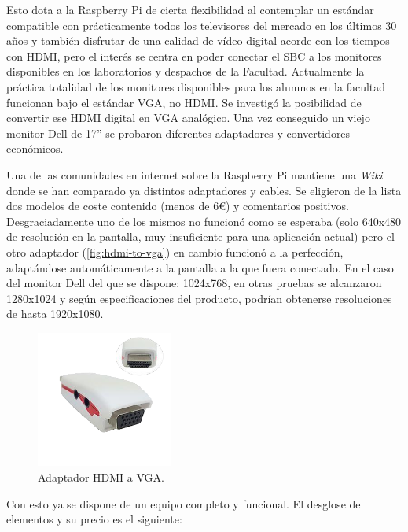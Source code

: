 Esto dota a la Raspberry Pi de cierta flexibilidad al contemplar un estándar compatible con prácticamente todos los televisores del mercado en los últimos 30 años y también disfrutar de una calidad de vídeo digital acorde con los tiempos con HDMI, pero el interés se centra en poder conectar el SBC a los monitores disponibles en los laboratorios y despachos de la Facultad. Actualmente la práctica totalidad de los monitores disponibles para los alumnos en la facultad funcionan bajo el estándar VGA, no HDMI. Se investigó la posibilidad de convertir ese HDMI digital en VGA analógico. Una vez conseguido un viejo monitor Dell de 17'' se probaron diferentes adaptadores y convertidores económicos.
	
		Una de las comunidades en internet sobre la Raspberry Pi mantiene una \emph{Wiki}  donde se han comparado ya distintos adaptadores y cables\cite{VerifiedPeripherals_vga}. Se eligieron de la lista dos modelos de coste contenido (menos de 6€) y comentarios positivos.
Desgraciadamente uno de los mismos no funcionó como se esperaba (solo 640x480 de resolución en la pantalla, muy insuficiente para una aplicación actual) pero el otro adaptador (\autoref{fig:hdmi-to-vga}) en cambio funcionó a la perfección, adaptándose automáticamente a la pantalla a la que fuera conectado. En el caso del monitor Dell del que se dispone: 1024x768, en otras pruebas se alcanzaron 1280x1024 y según especificaciones del producto, podrían obtenerse resoluciones de hasta 1920x1080. 

\begin{figure}[!Hb]
\centering
  \includegraphics[width=0.40\textwidth]{img/hdmi-to-vga-output-projector-monitors-adapter.png}
  \caption{Adaptador HDMI a VGA.}	\label{fig:hdmi-to-vga}
\end{figure}


\pagebreak
Con esto ya se dispone de un equipo completo y funcional. El desglose de elementos y su precio es el siguiente:

